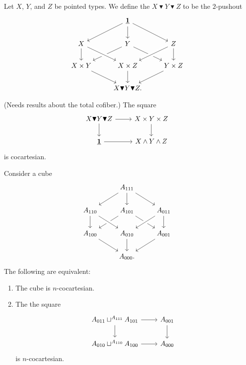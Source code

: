 \begin{defn}
Let $X$, $Y$, and $Z$ be pointed types. We define the  $X\blacktriangledown Y\blacktriangledown Z$ to be the $2$-pushout
\begin{equation*}
\begin{tikzcd}
& \unit \arrow[dl] \arrow[d] \arrow[dr] \\
X \arrow[d] & Y \arrow[dl] \arrow[dr] & Z \arrow[d] \\
X\times Y \arrow[dr] & X\times Z \arrow[d] \arrow[from=ul,crossing over] \arrow[from=ur,crossing over] & Y\times Z \arrow[dl] \\
& X\blacktriangledown Y\blacktriangledown Z.
\end{tikzcd}
\end{equation*}
\end{defn}

\begin{thm}
(Needs results about the total cofiber.) The square
\begin{equation*}
\begin{tikzcd}
X\blacktriangledown Y\blacktriangledown Z \arrow[r] \arrow[d] & X\times Y\times Z \arrow[d] \\
\unit \arrow[r] & X\wedge Y\wedge Z
\end{tikzcd}
\end{equation*}
is cocartesian.
\end{thm}

\begin{conj}
Consider a cube
\begin{equation*}
\begin{tikzcd}
& A_{111} \arrow[dl] \arrow[d] \arrow[dr] \\
A_{110} \arrow[d] & A_{101} \arrow[dl] \arrow[dr] & A_{011} \arrow[d] \\
A_{100} \arrow[dr] & A_{010} \arrow[d] \arrow[from=ul,crossing over] \arrow[from=ur,crossing over] & A_{001} \arrow[dl] \\
& A_{000}.
\end{tikzcd}
\end{equation*}
The following are equivalent:
\begin{enumerate}
\item The cube is $n$-cocartesian.
\item The the square
\begin{equation*}
\begin{tikzcd}
A_{011}\sqcup^{A_{111}} A_{101} \arrow[r] \arrow[d] & A_{001} \arrow[d] \\
A_{010}\sqcup^{A_{110}} A_{100} \arrow[r] & A_{000}
\end{tikzcd}
\end{equation*}
is $n$-cocartesian.
\end{enumerate}
\end{conj}

